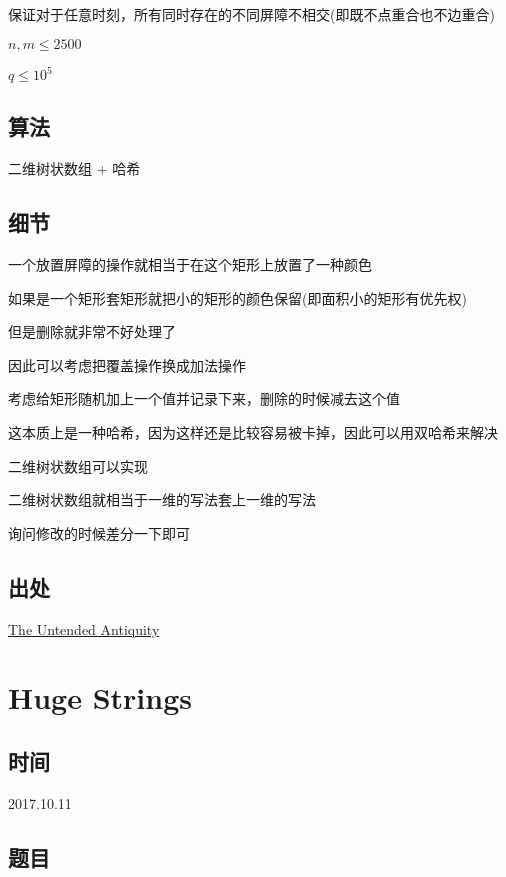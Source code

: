 \documentclass[a4paper]{article}
\begin{document}
		保证对于任意时刻，所有同时存在的不同屏障不相交(即既不点重合也不边重合)
		
		$n,m \leq 2500$
		
		$q \leq 10^5$
		
	\subsection{算法}
		
		二维树状数组 + 哈希
		
	\subsection{细节}
		
		一个放置屏障的操作就相当于在这个矩形上放置了一种颜色
		
		如果是一个矩形套矩形就把小的矩形的颜色保留(即面积小的矩形有优先权)
		
		但是删除就非常不好处理了
		
		因此可以考虑把覆盖操作换成加法操作
		
		考虑给矩形随机加上一个值并记录下来，删除的时候减去这个值
		
		这本质上是一种哈希，因为这样还是比较容易被卡掉，因此可以用双哈希来解决
		
		二维树状数组可以实现
		
		二维树状数组就相当于一维的写法套上一维的写法
		
		询问修改的时候差分一下即可
		
	\subsection{出处}
		
		\href {http://codeforces.com/problemset/problem/869/E}{The Untended Antiquity}
	
	\newpage
	
	\section{Huge Strings}
		
	\subsection{时间}
		
		2017.10.11
		
	\subsection{题目}
		
\end{document}
